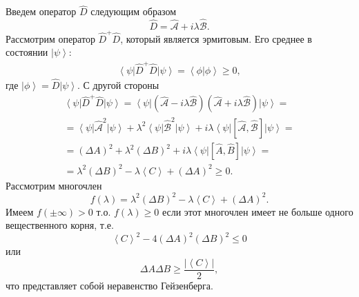 Введем оператор $\hat{D}$ следующим образом
\begin{equation}
\hat{D} = \hat{\mathcal{A}} + i \lambda \hat{\mathcal{B}}.
\nonumber
\end{equation}
Рассмотрим оператор $\hat{D}^{+}\hat{D}$, который является
эрмитовым. Его среднее в состоянии $\left|\psi\right>$:
\begin{eqnarray}
\left<\psi\right|\hat{D}^{+}\hat{D}\left|\psi\right> = 
\left<\phi\right|\left.\phi\right> \ge 0,
\nonumber
\end{eqnarray}
где
$\left|\phi\right> = \hat{D}\left|\psi\right>$. С другой стороны 
\begin{eqnarray}
\left<\psi\right|\hat{D}^{+}\hat{D}\left|\psi\right> = 
\left<\psi\right|\left(\hat{\mathcal{A}} - i \lambda \hat{\mathcal{B}}\right)
\left(\hat{\mathcal{A}} + i \lambda \hat{\mathcal{B}}\right)\left|\psi\right> =
\nonumber \\
=
\left<\psi\right|\hat{\mathcal{A}}^2\left|\psi\right> +
\lambda^2\left<\psi\right|\hat{\mathcal{B}}^2\left|\psi\right> +
i \lambda 
\left<\psi\right|
\left[ \mathcal{\hat{A}}, \mathcal{\hat{B}}\right]
\left|\psi\right>
 = 
\nonumber \\
=
\left(\Delta A\right)^2 + \lambda^2 \left(\Delta B\right)^2 +
i \lambda 
\left<\psi\right|
\left[ \hat{A}, \hat{B}\right]
\left|\psi\right> = 
\nonumber \\
=
\lambda^2 \left(\Delta B\right)^2 - 
\lambda \left<C\right> + \left(\Delta A\right)^2 \ge 0.
\nonumber
\end{eqnarray}
Рассмотрим многочлен 
\[
f\left(\lambda\right) = \lambda^2 \left(\Delta B\right)^2 - 
\lambda \left<C\right> + \left(\Delta A\right)^2.
\]
Имеем $f\left( \pm \infty \right) > 0$ т.о. 
$f\left(\lambda\right) \ge 0$ если этот многочлен имеет не больше
одного вещественного корня, т.е.
\[
\left<C\right>^2 - 4 \left(\Delta A\right)^2 \left(\Delta B\right)^2
\le 0
\]
или
\begin{equation}
  \Delta A \Delta B \ge \frac{\left|\left< C \right>\right|}{2},
  \label{eqAddHeisenbergUncertaintyPrinciple}
\end{equation}
что представляет собой неравенство Гейзенберга. 


